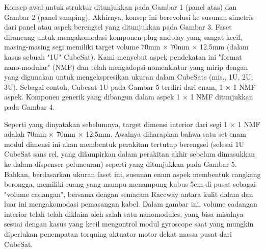 Konsep awal untuk struktur ditunjukkan pada Gambar 1 (panel atas) dan Gambar 2 (panel samping). Akhirnya, konsep ini berevolusi ke susunan simetris dari panel atau aspek berengsel yang ditunjukkan pada Gambar 3. Faset dirancang untuk mengakomodasi komponen plug-andplay yang sangat kecil, masing-masing segi memiliki target volume 70mm × 70mm × 12.5mm (dalam kasus sebuah "1U" CubeSat). Kami menyebut aspek pendekatan ini "format nano-modular" (NMF) dan telah mengadopsi nomenklatur yang mirip dengan yang digunakan untuk mengekspresikan ukuran dalam CubeSats (mis., 1U, 2U, 3U). Sebagai contoh, Cubesat 1U pada Gambar 5 terdiri dari enam, 1 × 1 NMF aspek. Komponen generik yang dibangun dalam aspek 1 × 1 NMF ditunjukkan pada Gambar 4.

Seperti yang dinyatakan sebelumnya, target dimensi interior dari segi 1 × 1 NMF adalah 70mm × 70mm × 12.5mm. Awalnya diharapkan bahwa satu set enam modul dimensi ini akan membentuk perakitan tertutup berengsel (selesai 1U CubeSat sans rel, yang dilampirkan dalam perakitan akhir sebelum dimasukkan ke dalam dispenser peluncuran) seperti yang ditunjukkan pada Gambar 5. Bahkan, berdasarkan ukuran faset ini, susunan enam aspek membentuk cangkang berongga, memiliki ruang yang mampu menampung kubus 5cm di pusat sebagai "volume cadangan", bersama dengan semacam Raceway antara kulit dalam dan luar ini mengakomodasi pemasangan kabel. Dalam gambar ini, volume cadangan interior telah telah diklaim oleh salah satu nanomodules, yang bisa misalnya sesuai dengan kasus yang kecil mengontrol modul gyroscope saat yang mungkin diperlukan penempatan torquing aktuator motor dekat massa pusat dari CubeSat.